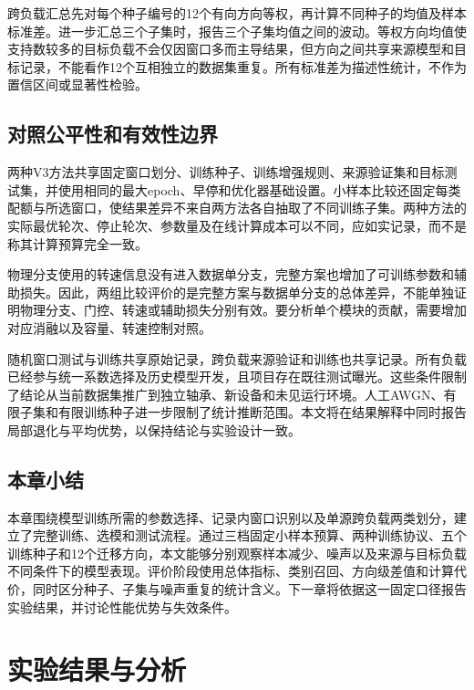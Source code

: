 \documentclass[UTF8,12pt,openany,twoside]{ctexbook}
\numberwithin{equation}{chapter}
\begin{document}
跨负载汇总先对每个种子编号的12个有向方向等权，再计算不同种子的均值及样本标准差。进一步汇总三个子集时，报告三个子集均值之间的波动。等权方向均值使支持数较多的目标负载不会仅因窗口多而主导结果，但方向之间共享来源模型和目标记录，不能看作12个互相独立的数据集重复。所有标准差为描述性统计，不作为置信区间或显著性检验。

\section{对照公平性和有效性边界}\label{ux5bf9ux7167ux516cux5e73ux6027ux548cux6709ux6548ux6027ux8fb9ux754c}

两种V3方法共享固定窗口划分、训练种子、训练增强规则、来源验证集和目标测试集，并使用相同的最大epoch、早停和优化器基础设置。小样本比较还固定每类配额与所选窗口，使结果差异不来自两方法各自抽取了不同训练子集。两种方法的实际最优轮次、停止轮次、参数量及在线计算成本可以不同，应如实记录，而不是称其计算预算完全一致。

物理分支使用的转速信息没有进入数据单分支，完整方案也增加了可训练参数和辅助损失。因此，两组比较评价的是完整方案与数据单分支的总体差异，不能单独证明物理分支、门控、转速或辅助损失分别有效。要分析单个模块的贡献，需要增加对应消融以及容量、转速控制对照。

随机窗口测试与训练共享原始记录，跨负载来源验证和训练也共享记录。所有负载已经参与统一系数选择及历史模型开发，且项目存在既往测试曝光。这些条件限制了结论从当前数据集推广到独立轴承、新设备和未见运行环境。人工AWGN、有限子集和有限训练种子进一步限制了统计推断范围。本文将在结果解释中同时报告局部退化与平均优势，以保持结论与实验设计一致。

\section{本章小结}\label{ux672cux7ae0ux5c0fux7ed3-2}

本章围绕模型训练所需的参数选择、记录内窗口识别以及单源跨负载两类划分，建立了完整训练、选模和测试流程。通过三档固定小样本预算、两种训练协议、五个训练种子和12个迁移方向，本文能够分别观察样本减少、噪声以及来源与目标负载不同条件下的模型表现。评价阶段使用总体指标、类别召回、方向级差值和计算代价，同时区分种子、子集与噪声重复的统计含义。下一章将依据这一固定口径报告实验结果，并讨论性能优势与失效条件。

\chapter{实验结果与分析}\label{ux7b2c5ux7ae0-ux5b9eux9a8cux7ed3ux679cux4e0eux5206ux6790}
\end{document}
